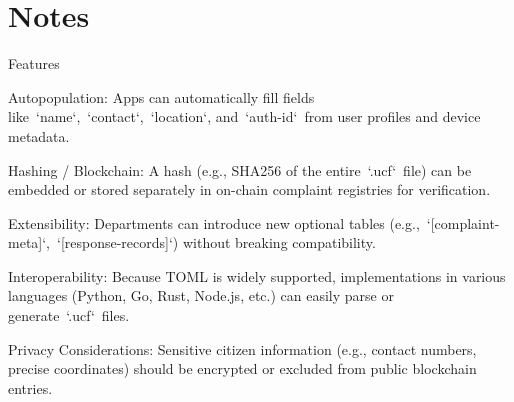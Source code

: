 \documentclass[12pt]{spec}
\begin{document}
\section{Notes}
\begin{specitemize}{Features}

  \item Autopopulation:  Apps can automatically fill fields
like `name`, `contact`, `location`, and `auth-id` from user profiles and device
metadata.

  \item Hashing / Blockchain:  A hash (e.g., SHA256 of the entire `.ucf` file)
can be embedded or stored separately in on-chain complaint registries for
verification.

  \item Extensibility:  Departments can introduce new optional tables
(e.g., `[complaint-meta]`, `[response-records]`) without breaking
compatibility.

  \item Interoperability:  Because TOML is widely supported, implementations in
various languages (Python, Go, Rust, Node.js, etc.) can easily parse or
generate `.ucf` files.

  \item Privacy Considerations:  Sensitive citizen information (e.g., contact
numbers, precise coordinates) should be encrypted or excluded from public
blockchain entries.

\end{specitemize}
\end{document}
